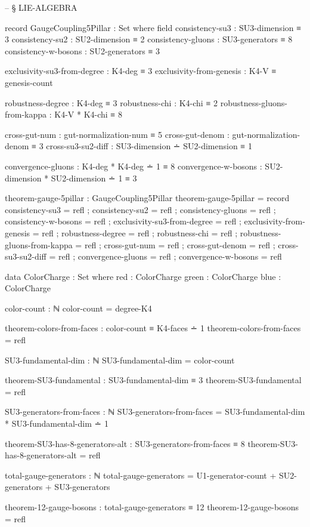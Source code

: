 \documentclass[11pt,a4paper]{book}
\begin{document}
\begin{code}
-- § LIE-ALGEBRA

record GaugeCoupling5Pillar : Set where
  field
    consistency-su3 : SU3-dimension ≡ 3
    consistency-su2 : SU2-dimension ≡ 2
    consistency-gluons : SU3-generators ≡ 8
    consistency-w-bosons : SU2-generators ≡ 3
    
    exclusivity-su3-from-degree : K4-deg ≡ 3
    exclusivity-from-genesis    : K4-V ≡ genesis-count
    
    robustness-degree : K4-deg ≡ 3
    robustness-chi : K4-chi ≡ 2
    robustness-gluons-from-kappa : K4-V * K4-chi ≡ 8
    
    cross-gut-num : gut-normalization-num ≡ 5
    cross-gut-denom : gut-normalization-denom ≡ 3
    cross-su3-su2-diff : SU3-dimension ∸ SU2-dimension ≡ 1
    
    convergence-gluons : K4-deg * K4-deg ∸ 1 ≡ 8
    convergence-w-bosons : SU2-dimension * SU2-dimension ∸ 1 ≡ 3

theorem-gauge-5pillar : GaugeCoupling5Pillar
theorem-gauge-5pillar = record
  { consistency-su3 = refl
  ; consistency-su2 = refl
  ; consistency-gluons = refl
  ; consistency-w-bosons = refl
  ; exclusivity-su3-from-degree = refl
  ; exclusivity-from-genesis = refl
  ; robustness-degree = refl
  ; robustness-chi = refl
  ; robustness-gluons-from-kappa = refl
  ; cross-gut-num = refl
  ; cross-gut-denom = refl
  ; cross-su3-su2-diff = refl
  ; convergence-gluons = refl
  ; convergence-w-bosons = refl
  }

data ColorCharge : Set where
  red   : ColorCharge
  green : ColorCharge
  blue  : ColorCharge

color-count : ℕ
color-count = degree-K4

theorem-colors-from-faces : color-count ≡ K4-faces ∸ 1
theorem-colors-from-faces = refl

SU3-fundamental-dim : ℕ
SU3-fundamental-dim = color-count

theorem-SU3-fundamental : SU3-fundamental-dim ≡ 3
theorem-SU3-fundamental = refl

SU3-generators-from-faces : ℕ
SU3-generators-from-faces = SU3-fundamental-dim * SU3-fundamental-dim ∸ 1

theorem-SU3-has-8-generators-alt : SU3-generators-from-faces ≡ 8
theorem-SU3-has-8-generators-alt = refl

total-gauge-generators : ℕ
total-gauge-generators = U1-generator-count + SU2-generators + SU3-generators

theorem-12-gauge-bosons : total-gauge-generators ≡ 12
theorem-12-gauge-bosons = refl


\end{code}
\end{document}
